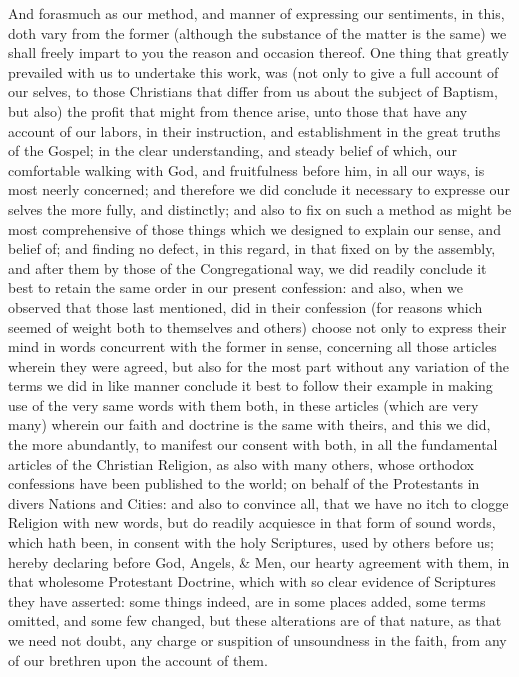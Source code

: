 \documentclass[12pt,a4paper]{book}
\begin{document}
And forasmuch as our method, and manner of expressing our sentiments, in this, doth vary from the former (although the substance of the matter is the same) we shall freely impart to you the reason and occasion thereof. One thing that greatly prevailed with us to undertake this work, was (not only to give a full account of our selves, to those Christians that differ from us about the subject of Baptism, but also) the profit that might from thence arise, unto those that have any account of our labors, in their instruction, and establishment in the great truths of the Gospel; in the clear understanding, and steady belief of which, our comfortable walking with God, and fruitfulness before him, in all our ways, is most neerly concerned; and therefore we did conclude it necessary to expresse our selves the more fully, and distinctly; and also to fix on such a method as might be most comprehensive of those things which we designed to explain our sense, and belief of; and finding no defect, in this regard, in that fixed on by the assembly, and after them by those of the Congregational way, we did readily conclude it best to retain the same order in our present confession: and also, when we observed that those last mentioned, did in their confession (for reasons which seemed of weight both to themselves and others) choose not only to express their mind in words concurrent with the former in sense, concerning all those articles wherein they were agreed, but also for the most part without any variation of the terms we did in like manner conclude it best to follow their example in making use of the very same words with them both, in these articles (which are very many) wherein our faith and doctrine is the same with theirs, and this we did, the more abundantly, to manifest our consent with both, in all the fundamental articles of the Christian Religion, as also with many others, whose orthodox confessions have been published to the world; on behalf of the Protestants in divers Nations and Cities: and also to convince all, that we have no itch to clogge Religion with new words, but do readily acquiesce in that form of sound words, which hath been, in consent with the holy Scriptures, used by others before us; hereby declaring before God, Angels, & Men, our hearty agreement with them, in that wholesome Protestant Doctrine, which with so clear evidence of Scriptures they have asserted: some things indeed, are in some places added, some terms omitted, and some few changed, but these alterations are of that nature, as that we need not doubt, any charge or suspition of unsoundness in the faith, from any of our brethren upon the account of them.
\end{document}
